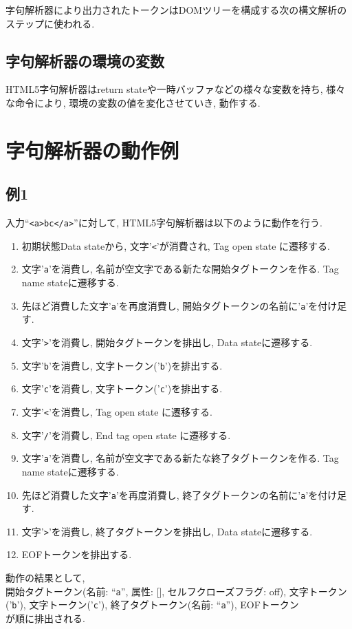 \documentclass[uplatex,a4j]{jsreport}
\begin{document}
字句解析器により出力されたトークンはDOMツリーを構成する次の構文解析のステップに使われる.

\subsection*{字句解析器の環境の変数}
HTML5字句解析器はreturn stateや一時バッファなどの様々な変数を持ち, 様々な命令により, 環境の変数の値を変化させていき, 動作する.

\section{字句解析器の動作例}
\subsection{例1}
入力``\texttt{<a>bc</a>}''に対して, HTML5字句解析器は以下のように動作を行う.\\
\begin{enumerate}
    \item 初期状態Data stateから, 文字'\texttt{<}'が消費され, Tag open state に遷移する.
    \item 文字'\texttt{a}'を消費し, 名前が空文字である新たな開始タグトークンを作る. Tag name stateに遷移する.
    \item 先ほど消費した文字'\texttt{a}'を再度消費し, 開始タグトークンの名前に'\texttt{a}'を付け足す.
    \item 文字'\texttt{>}'を消費し, 開始タグトークンを排出し, Data stateに遷移する.
    \item 文字'\texttt{b}'を消費し, 文字トークン('\texttt{b}')を排出する.
    \item 文字'\texttt{c}'を消費し, 文字トークン('\texttt{c}')を排出する.
    \item 文字'\texttt{<}'を消費し, Tag open state に遷移する.
    \item 文字'\texttt{/}'を消費し, End tag open state に遷移する.
    \item 文字'\texttt{a}'を消費し, 名前が空文字である新たな終了タグトークンを作る. Tag name stateに遷移する.
    \item 先ほど消費した文字'\texttt{a}'を再度消費し, 終了タグトークンの名前に'\texttt{a}'を付け足す.
    \item 文字'\texttt{>}'を消費し, 終了タグトークンを排出し, Data stateに遷移する.
    \item EOFトークンを排出する.
\end{enumerate}
動作の結果として,\\
開始タグトークン(名前: ``\texttt{a}'', 属性: [], セルフクローズフラグ: off), 文字トークン('\texttt{b}'), 文字トークン('\texttt{c}'), 終了タグトークン(名前: ``\texttt{a}''), EOFトークン\\
が順に排出される.
\end{document}
